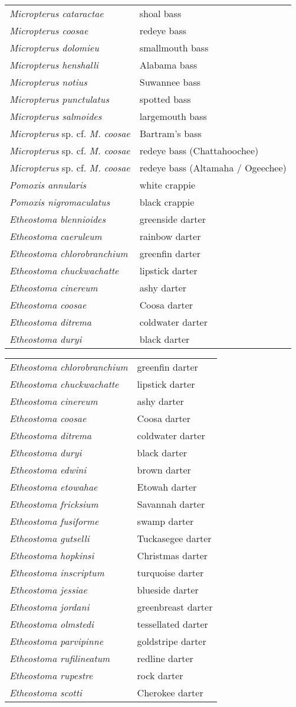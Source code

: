 \documentclass[11pt]{article}
\begin{document}
\begin{tabular}{@{}L{3in}L{3in}@{}}
\textit{Micropterus cataractae} &   shoal bass\tabularnewline
\textit{Micropterus coosae} &   redeye bass\tabularnewline
\textit{Micropterus dolomieu} &   smallmouth bass\tabularnewline
\textit{Micropterus henshalli} &   Alabama bass\tabularnewline
\textit{Micropterus notius} &   Suwannee bass\tabularnewline
\textit{Micropterus punctulatus} &   spotted bass\tabularnewline
\textit{Micropterus salmoides} &   largemouth bass\tabularnewline
\textit{Micropterus} sp. cf. \textit{M. coosae} &   Bartram's bass\tabularnewline
\textit{Micropterus} sp. cf. \textit{M. coosae} &   redeye bass (Chattahoochee)\tabularnewline
\textit{Micropterus} sp. cf. \textit{M. coosae} &   redeye bass (Altamaha / Ogeechee)\tabularnewline
\textit{Pomoxis annularis} &   white crappie\tabularnewline
\textit{Pomoxis nigromaculatus} &   black crappie\tabularnewline
\textit{Etheostoma blennioides} &   greenside darter\tabularnewline
\textit{Etheostoma caeruleum} &   rainbow darter\tabularnewline
\textit{Etheostoma chlorobranchium} &   greenfin darter\tabularnewline
\textit{Etheostoma chuckwachatte} &   lipstick darter\tabularnewline
\textit{Etheostoma cinereum} &   ashy darter\tabularnewline
\textit{Etheostoma coosae} &   Coosa darter\tabularnewline
\textit{Etheostoma ditrema} &   coldwater darter\tabularnewline
\textit{Etheostoma duryi} &   black darter\tabularnewline
\end{tabular}

\newpage

\vspace{\baselineskip}

%
\textbf{\Student}

\begin{tabular}{@{}L{3in}L{3in}@{}}
\textit{Etheostoma chlorobranchium} &   greenfin darter\tabularnewline
\textit{Etheostoma chuckwachatte} &   lipstick darter\tabularnewline
\textit{Etheostoma cinereum} &   ashy darter\tabularnewline
\textit{Etheostoma coosae} &   Coosa darter\tabularnewline
\textit{Etheostoma ditrema} &   coldwater darter\tabularnewline
\textit{Etheostoma duryi} &   black darter\tabularnewline
\textit{Etheostoma edwini} &   brown darter\tabularnewline
\textit{Etheostoma etowahae} &   Etowah darter\tabularnewline
\textit{Etheostoma fricksium} &   Savannah darter\tabularnewline
\textit{Etheostoma fusiforme} &   swamp darter\tabularnewline
\textit{Etheostoma gutselli} &   Tuckasegee darter\tabularnewline
\textit{Etheostoma hopkinsi} &   Christmas darter\tabularnewline
\textit{Etheostoma inscriptum} &   turquoise darter\tabularnewline
\textit{Etheostoma jessiae} &   blueside darter\tabularnewline
\textit{Etheostoma jordani} &   greenbreast darter\tabularnewline
\textit{Etheostoma olmstedi} &   tessellated darter\tabularnewline
\textit{Etheostoma parvipinne} &   goldstripe darter\tabularnewline
\textit{Etheostoma rufilineatum} &   redline darter\tabularnewline
\textit{Etheostoma rupestre} &   rock darter\tabularnewline
\textit{Etheostoma scotti} &   Cherokee darter\tabularnewline
\end{tabular}
\end{document}
